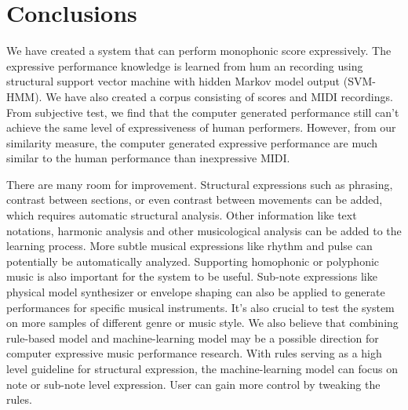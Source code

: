 \chapter{Conclusions}
We have created a system that can perform monophonic score expressively. The expressive performance knowledge is learned from hum an recording using structural support vector machine with hidden Markov model output (SVM-HMM). We have also created a corpus consisting of scores and MIDI recordings.  From subjective test, we find that the computer generated performance still can't achieve the same level of expressiveness of human performers. However, from our similarity measure, the computer generated expressive performance are much similar to the human performance than inexpressive MIDI. %

There are many room for improvement. Structural expressions such as phrasing, contrast between sections, or even contrast between movements can be added, which requires automatic structural analysis. Other information like text notations, harmonic analysis and other musicological analysis can be added to the learning process. More subtle musical expressions like rhythm and pulse can potentially be automatically analyzed. Supporting homophonic or polyphonic music is also important for the system to be useful. Sub-note expressions like physical model synthesizer or envelope shaping can also be applied to generate performances for specific musical instruments. It's also crucial to test the system on more samples of different genre or music style. We also believe that combining rule-based model and machine-learning model may be a possible direction for computer expressive music performance research. With rules serving as a high level guideline for structural expression, the machine-learning model can focus on note or sub-note level expression. User can gain more control by tweaking the rules.


